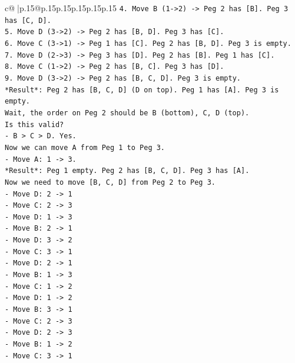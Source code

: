 \documentclass{article}
\begin{document}
{\begin{supertabular}{c@{$\;$}|p{.15\linewidth}@{}p{.15\linewidth}p{.15\linewidth}p{.15\linewidth}p{.15\linewidth}p{.15\linewidth}}
{{{\texttt{4. Move B (1{-}>2) {-}> Peg 2 has {[}B{]}. Peg 3 has {[}C, D{]}.} \\
\texttt{5. Move D (3{-}>2) {-}> Peg 2 has {[}B, D{]}. Peg 3 has {[}C{]}.} \\
\texttt{6. Move C (3{-}>1) {-}> Peg 1 has {[}C{]}. Peg 2 has {[}B, D{]}. Peg 3 is empty.} \\
\texttt{7. Move D (2{-}>3) {-}> Peg 3 has {[}D{]}. Peg 2 has {[}B{]}. Peg 1 has {[}C{]}.} \\
\texttt{8. Move C (1{-}>2) {-}> Peg 2 has {[}B, C{]}. Peg 3 has {[}D{]}.} \\
\texttt{9. Move D (3{-}>2) {-}> Peg 2 has {[}B, C, D{]}. Peg 3 is empty.} \\
\texttt{*Result*: Peg 2 has {[}B, C, D{]} (D on top). Peg 1 has {[}A{]}. Peg 3 is empty.} \\
\texttt{Wait, the order on Peg 2 should be B (bottom), C, D (top).} \\
\texttt{Is this valid?} \\
\texttt{{-} B > C > D. Yes.} \\
\texttt{Now we can move A from Peg 1 to Peg 3.} \\
\texttt{{-} Move A: 1 {-}> 3.} \\
\texttt{*Result*: Peg 1 empty. Peg 2 has {[}B, C, D{]}. Peg 3 has {[}A{]}.} \\
\texttt{Now we need to move {[}B, C, D{]} from Peg 2 to Peg 3.} \\
\texttt{{-} Move D: 2 {-}> 1} \\
\texttt{{-} Move C: 2 {-}> 3} \\
\texttt{{-} Move D: 1 {-}> 3} \\
\texttt{{-} Move B: 2 {-}> 1} \\
\texttt{{-} Move D: 3 {-}> 2} \\
\texttt{{-} Move C: 3 {-}> 1} \\
\texttt{{-} Move D: 2 {-}> 1} \\
\texttt{{-} Move B: 1 {-}> 3} \\
\texttt{{-} Move C: 1 {-}> 2} \\
\texttt{{-} Move D: 1 {-}> 2} \\
\texttt{{-} Move B: 3 {-}> 1} \\
\texttt{{-} Move C: 2 {-}> 3} \\
\texttt{{-} Move D: 2 {-}> 3} \\
\texttt{{-} Move B: 1 {-}> 2} \\
\texttt{{-} Move C: 3 {-}> 1} \\
}}}
\end{supertabular}}
\end{document}
